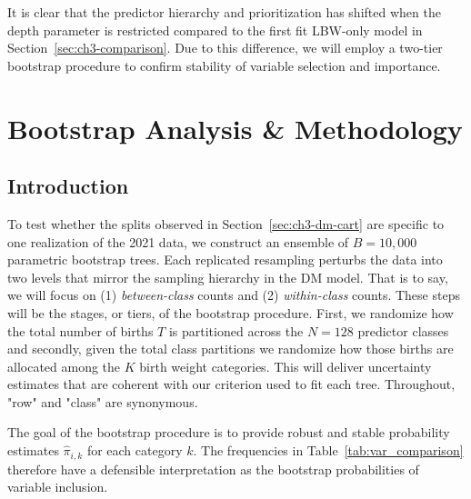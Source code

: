 It is clear that the predictor hierarchy and prioritization has shifted when the depth parameter is restricted compared to the first fit LBW-only model in Section~\ref{sec:ch3-comparison}. Due to this difference, we will employ a two-tier bootstrap procedure to confirm stability of variable selection and importance. 

\section{Bootstrap Analysis \& Methodology}
\label{sec:ch3:boot}

\subsection{Introduction}
\label{sec:ch3-boot-intro}
To test whether the splits observed in Section~\ref{sec:ch3-dm-cart} are specific to one realization of the 2021 data, we construct an ensemble of \(B =10,000\) parametric bootstrap trees. Each replicated resampling perturbs the data into two levels that mirror the sampling hierarchy in the DM model. That is to say, we will focus on (1) \emph{between-class} counts and (2) \emph{within-class} counts. These steps will be the stages, or tiers, of the bootstrap procedure. First, we randomize how the total number of births \(T\) is partitioned across the \(N=128\) predictor classes and secondly, given the total class partitions we randomize how those births are allocated among the \(K\) birth weight categories. This will deliver uncertainty estimates that are coherent with our criterion used to fit each tree. Throughout, "row" and "class" are synonymous. 

The goal of the bootstrap procedure is to provide robust and stable probability estimates \(\hat{\pi}_{i,k}\) for each category \(k\). The frequencies in Table~\ref{tab:var_comparison} therefore have a defensible interpretation as the bootstrap probabilities of variable inclusion.

